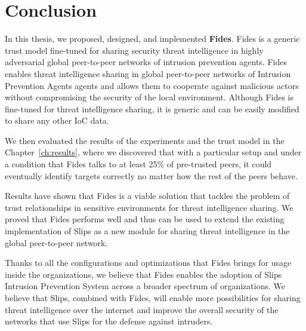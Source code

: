 \chapter{Conclusion}
\label{ch:conclusion}

In this thesis, we proposed, designed, and implemented \textbf{Fides}. Fides is a generic trust model fine-tuned for sharing security threat intelligence in highly adversarial global peer-to-peer networks of intrusion prevention agents.
Fides enables threat intelligence sharing in global peer-to-peer networks of Intrusion Prevention Agents agents and allows them to cooperate against malicious actors without compromising the security of the local environment. 
Although Fides is fine-tuned for threat intelligence sharing, it is generic and can be easily modified to share any other IoC data.

We then evaluated the results of the experiments and the trust model in the Chapter~\ref{ch:results}, where we discovered that with a particular setup and under a condition that Fides talks to at least 25\% of pre-trusted peers, it could eventually identify targets correctly no matter how the rest of the peers behave.

Results have shown that Fides is a viable solution that tackles the problem of trust relationships in sensitive environments for threat intelligence sharing. 
We proved that Fides performs well and thus can be used to extend the existing implementation of Slips as a new module for sharing threat intelligence in the global peer-to-peer network.

Thanks to all the configurations and optimizations that Fides brings for usage inside the organizations, we believe that Fides enables the adoption of Slips Intrusion Prevention System across a broader spectrum of organizations.
We believe that Slips, combined with Fides, will enable more possibilities for sharing threat intelligence over the internet and improve the overall security of the networks that use Slips for the defense against intruders.


